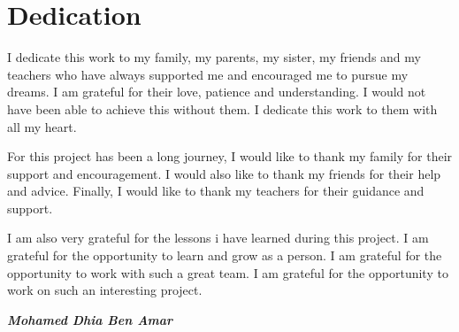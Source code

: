 \chapter*{Dedication}    

I dedicate this work to my family, my parents, my sister, my friends and my teachers who have always supported me and encouraged me to pursue my dreams. I am grateful for their love, patience and understanding. I would not have been able to achieve this without them. I dedicate this work to them with all my heart.
\newline

\noindent For this project has been a long journey, I would like to thank my family for their support and encouragement. I would also like to thank my friends for their help and advice. Finally, I would like to thank my teachers for their guidance and support.
\newline

\noindent I am also very grateful for the lessons i have learned during this project. I am grateful for the opportunity to learn and grow as a person. I am grateful for the opportunity to work with such a great team. I am grateful for the opportunity to work on such an interesting project.

\begin{flushright}
\textbf{\textit{Mohamed Dhia Ben Amar}}
\end{flushright}

